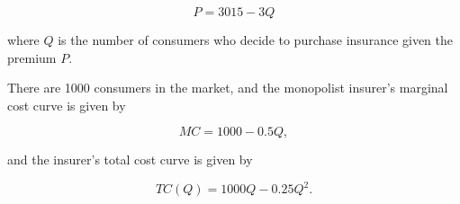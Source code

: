 \documentclass[12pt]{article}
\begin{document}
\begin{equation*}
P = 3015 - 3Q
\end{equation*}

where $Q$ is the number of consumers who decide to purchase insurance given the premium $P$.

There are 1000 consumers in the market, and the monopolist insurer's marginal cost curve is given by

\begin{equation*}
MC = 1000 - 0.5Q,
\end{equation*}

and the insurer's total cost curve is given by

\begin{equation*}
TC(Q) = 1000Q - 0.25Q^2.
\end{equation*}

\vspace{3mm}
\end{document}
